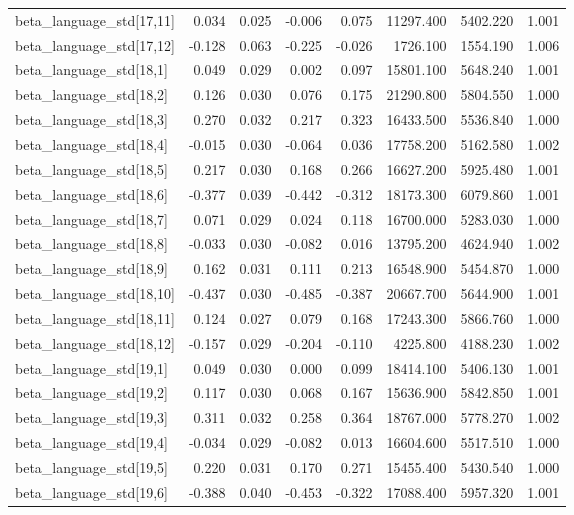 \begin{tabular}{lrrrrrrr}
beta\_language\_std[17,11] & 0.034 & 0.025 & -0.006 & 0.075 & 11297.400 & 5402.220 & 1.001 \\
beta\_language\_std[17,12] & -0.128 & 0.063 & -0.225 & -0.026 & 1726.100 & 1554.190 & 1.006 \\
beta\_language\_std[18,1] & 0.049 & 0.029 & 0.002 & 0.097 & 15801.100 & 5648.240 & 1.001 \\
beta\_language\_std[18,2] & 0.126 & 0.030 & 0.076 & 0.175 & 21290.800 & 5804.550 & 1.000 \\
beta\_language\_std[18,3] & 0.270 & 0.032 & 0.217 & 0.323 & 16433.500 & 5536.840 & 1.000 \\
beta\_language\_std[18,4] & -0.015 & 0.030 & -0.064 & 0.036 & 17758.200 & 5162.580 & 1.002 \\
beta\_language\_std[18,5] & 0.217 & 0.030 & 0.168 & 0.266 & 16627.200 & 5925.480 & 1.001 \\
beta\_language\_std[18,6] & -0.377 & 0.039 & -0.442 & -0.312 & 18173.300 & 6079.860 & 1.001 \\
beta\_language\_std[18,7] & 0.071 & 0.029 & 0.024 & 0.118 & 16700.000 & 5283.030 & 1.000 \\
beta\_language\_std[18,8] & -0.033 & 0.030 & -0.082 & 0.016 & 13795.200 & 4624.940 & 1.002 \\
beta\_language\_std[18,9] & 0.162 & 0.031 & 0.111 & 0.213 & 16548.900 & 5454.870 & 1.000 \\
beta\_language\_std[18,10] & -0.437 & 0.030 & -0.485 & -0.387 & 20667.700 & 5644.900 & 1.001 \\
beta\_language\_std[18,11] & 0.124 & 0.027 & 0.079 & 0.168 & 17243.300 & 5866.760 & 1.000 \\
beta\_language\_std[18,12] & -0.157 & 0.029 & -0.204 & -0.110 & 4225.800 & 4188.230 & 1.002 \\
beta\_language\_std[19,1] & 0.049 & 0.030 & 0.000 & 0.099 & 18414.100 & 5406.130 & 1.001 \\
beta\_language\_std[19,2] & 0.117 & 0.030 & 0.068 & 0.167 & 15636.900 & 5842.850 & 1.001 \\
beta\_language\_std[19,3] & 0.311 & 0.032 & 0.258 & 0.364 & 18767.000 & 5778.270 & 1.002 \\
beta\_language\_std[19,4] & -0.034 & 0.029 & -0.082 & 0.013 & 16604.600 & 5517.510 & 1.000 \\
beta\_language\_std[19,5] & 0.220 & 0.031 & 0.170 & 0.271 & 15455.400 & 5430.540 & 1.000 \\
beta\_language\_std[19,6] & -0.388 & 0.040 & -0.453 & -0.322 & 17088.400 & 5957.320 & 1.001 \\

\end{tabular}
